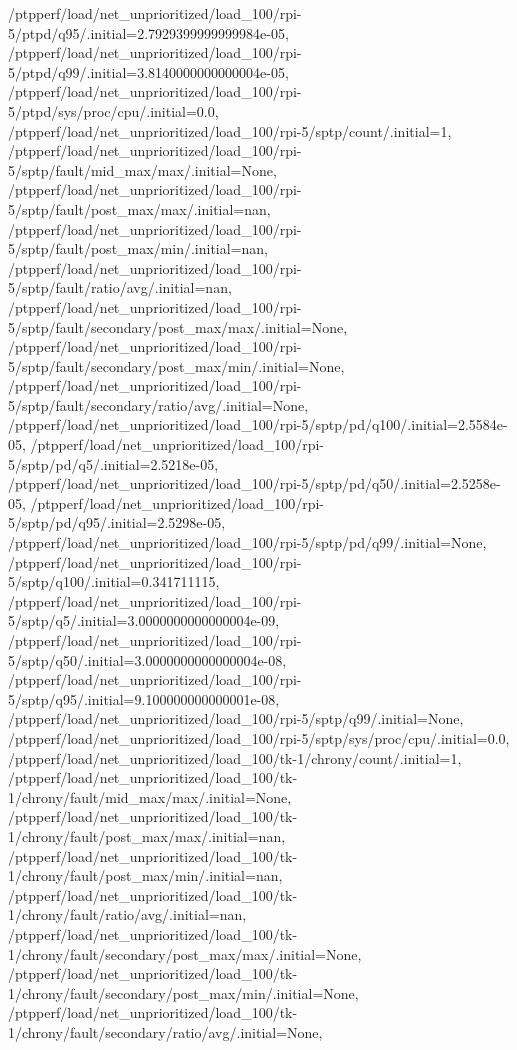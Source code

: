 {    /ptpperf/load/net_unprioritized/load_100/rpi-5/ptpd/q95/.initial=2.7929399999999984e-05,
    /ptpperf/load/net_unprioritized/load_100/rpi-5/ptpd/q99/.initial=3.8140000000000004e-05,
    /ptpperf/load/net_unprioritized/load_100/rpi-5/ptpd/sys/proc/cpu/.initial=0.0,
    /ptpperf/load/net_unprioritized/load_100/rpi-5/sptp/count/.initial=1,
    /ptpperf/load/net_unprioritized/load_100/rpi-5/sptp/fault/mid_max/max/.initial=None,
    /ptpperf/load/net_unprioritized/load_100/rpi-5/sptp/fault/post_max/max/.initial=nan,
    /ptpperf/load/net_unprioritized/load_100/rpi-5/sptp/fault/post_max/min/.initial=nan,
    /ptpperf/load/net_unprioritized/load_100/rpi-5/sptp/fault/ratio/avg/.initial=nan,
    /ptpperf/load/net_unprioritized/load_100/rpi-5/sptp/fault/secondary/post_max/max/.initial=None,
    /ptpperf/load/net_unprioritized/load_100/rpi-5/sptp/fault/secondary/post_max/min/.initial=None,
    /ptpperf/load/net_unprioritized/load_100/rpi-5/sptp/fault/secondary/ratio/avg/.initial=None,
    /ptpperf/load/net_unprioritized/load_100/rpi-5/sptp/pd/q100/.initial=2.5584e-05,
    /ptpperf/load/net_unprioritized/load_100/rpi-5/sptp/pd/q5/.initial=2.5218e-05,
    /ptpperf/load/net_unprioritized/load_100/rpi-5/sptp/pd/q50/.initial=2.5258e-05,
    /ptpperf/load/net_unprioritized/load_100/rpi-5/sptp/pd/q95/.initial=2.5298e-05,
    /ptpperf/load/net_unprioritized/load_100/rpi-5/sptp/pd/q99/.initial=None,
    /ptpperf/load/net_unprioritized/load_100/rpi-5/sptp/q100/.initial=0.341711115,
    /ptpperf/load/net_unprioritized/load_100/rpi-5/sptp/q5/.initial=3.0000000000000004e-09,
    /ptpperf/load/net_unprioritized/load_100/rpi-5/sptp/q50/.initial=3.0000000000000004e-08,
    /ptpperf/load/net_unprioritized/load_100/rpi-5/sptp/q95/.initial=9.100000000000001e-08,
    /ptpperf/load/net_unprioritized/load_100/rpi-5/sptp/q99/.initial=None,
    /ptpperf/load/net_unprioritized/load_100/rpi-5/sptp/sys/proc/cpu/.initial=0.0,
    /ptpperf/load/net_unprioritized/load_100/tk-1/chrony/count/.initial=1,
    /ptpperf/load/net_unprioritized/load_100/tk-1/chrony/fault/mid_max/max/.initial=None,
    /ptpperf/load/net_unprioritized/load_100/tk-1/chrony/fault/post_max/max/.initial=nan,
    /ptpperf/load/net_unprioritized/load_100/tk-1/chrony/fault/post_max/min/.initial=nan,
    /ptpperf/load/net_unprioritized/load_100/tk-1/chrony/fault/ratio/avg/.initial=nan,
    /ptpperf/load/net_unprioritized/load_100/tk-1/chrony/fault/secondary/post_max/max/.initial=None,
    /ptpperf/load/net_unprioritized/load_100/tk-1/chrony/fault/secondary/post_max/min/.initial=None,
    /ptpperf/load/net_unprioritized/load_100/tk-1/chrony/fault/secondary/ratio/avg/.initial=None,
}
